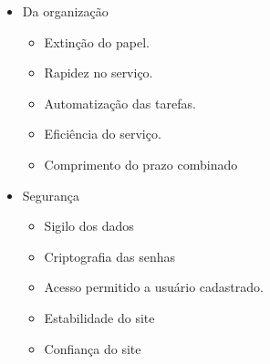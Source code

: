 \begin{itemize}
	 \item Da organização
	   \begin{itemize}
	    \item Extinção do papel.
	    \item Rapidez no serviço.
	    \item Automatização das tarefas.
	    \item Eficiência do serviço.
	    \item Comprimento do prazo combinado
	   \end{itemize} 
	   
	 \item Segurança
	   \begin{itemize}
	    \item Sigilo dos dados
	    \item Criptografia das senhas
	    \item Acesso permitido a usuário cadastrado.
	    \item Estabilidade do site	    
	    \item Confiança do site
	   \end{itemize}
	   
       \end{itemize}
